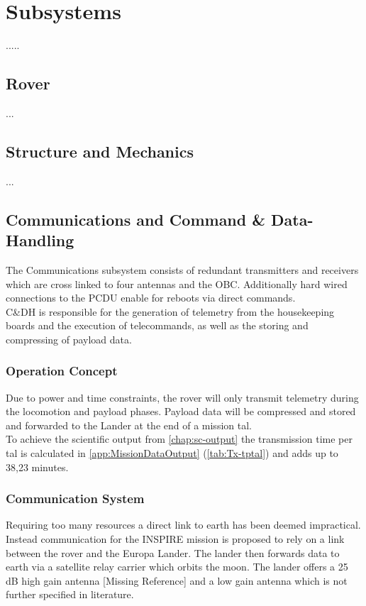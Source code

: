 \chapter{Subsystems}
\label{chap:subsystems}
.....

   

\section{Rover}
\label{sec:rover}
...
\section{Structure and Mechanics}
\label{sec:mechanics}
...
\section{Communications and Command \& Data-Handling}
\label{sec:comm}
The Communications subsystem consists of redundant transmitters and receivers which are cross linked to four antennas and the OBC. Additionally hard wired connections to the PCDU enable for reboots via direct commands.\\
C\&DH is responsible for the generation of telemetry from the housekeeping boards and the execution of telecommands, as well as the storing and compressing of payload data. 

\subsection{Operation Concept}

Due to power and time constraints, the rover will only transmit telemetry during the locomotion and payload phases. Payload data will be compressed and stored and forwarded to the Lander at the end of a mission tal. \\ 
 
To achieve the scientific output from \autoref{chap:sc-output} the transmission time per tal is calculated in \autoref{app:MissionDataOutput} (\autoref{tab:Tx-tptal}) and adds up to 38,23 minutes. 
	
\subsection{Communication System}
Requiring too many resources a direct link to earth has been deemed impractical. Instead communication for the INSPIRE mission is proposed to rely on a link between the rover and the Europa Lander. The lander then forwards data to earth via a satellite relay carrier which orbits the moon. The lander offers a 25 dB high gain antenna [Missing Reference] and a low gain antenna which is not further specified in literature.\\


